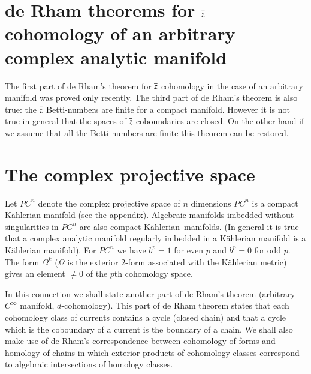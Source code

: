 \section*{de Rham theorems for $\overline{z}$ cohomology of an arbitrary
  complex analytic manifold}

The first part of de Rham's theorem for $\overline{z}$ cohomology in the
case of an arbitrary manifold was proved only recently. The third part
of de Rham's theorem is also true: the $\overline{z}$ Betti-numbers are
finite for a compact manifold. However it is not true in general that
the spaces of $\overline{z}$ coboundaries are closed. On the other hand if
we assume that all the Betti-numbers are finite this theorem can be
restored.

\section*{The complex projective space}

Let $PC^{n}$ denote the complex projective space of $n$ dimensions
$PC^{n}$ is a compact K\"ahlerian manifold (see the
appendix). Algebraic manifolds imbedded without singularities in
$PC^{n}$ are also compact K\"ahlerian\pageoriginale\ manifolds. (In
general it is true that a complex analytic manifold regularly imbedded
in a K\"ahlerian manifold is a K\"ahlerian manifold). For $PC^{n}$ we
have $b^{p}=1$ for even $p$ and $b^{p}=0$ for odd $p$. The form
$\Omega^{k}$ ($\Omega$ is the exterior $2$-form associated with the
K\"ahlerian metric) gives an element $\neq 0$ of the $p$th cohomology
space.

In this connection we shall state another part of de Rham's theorem
(arbitrary $C^{\infty}$ manifold, $d$-cohomology). This part of de Rham
theorem states that each cohomology class of currents contains a cycle
(closed chain) and that a cycle which is the coboundary of a current
is the boundary of a chain. We shall also make use of de Rham's
correspondence between cohomology of forms and homology of chains in
which exterior products of cohomology classes correspond to algebraic
intersections of homology classes.

